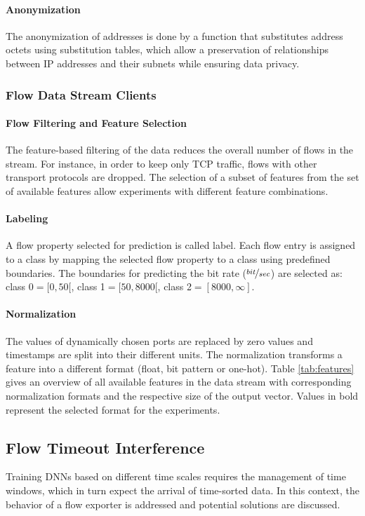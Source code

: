 \documentclass[conference]{IEEEtran}
\begin{document}
\paragraph{Anonymization}
The anonymization of addresses is done by a function that substitutes address octets using substitution tables, which allow a preservation of relationships between IP addresses and their subnets while ensuring data privacy. 

\subsubsection{Flow Data Stream Clients}\label{sec:flow_data_stream_clients}

\paragraph{Flow Filtering and Feature Selection}
The feature-based filtering of the data reduces the overall number of flows in the stream. For instance, in order to keep only TCP traffic, flows with other transport protocols are dropped. The selection of a subset of features from the set of available features allow experiments with different feature combinations.

\paragraph{Labeling}
A flow property selected for prediction is called label. Each flow entry is assigned to a class by mapping the selected flow property to a class using predefined boundaries. The boundaries for predicting the bit rate ($\nicefrac{bit}{sec}$) are selected as: class $0=[0, 50[$, class 1$=[50, 8000[$, class 2$= [8000, \infty]$.

\paragraph{Normalization}
The values of dynamically chosen ports are replaced by zero values and timestamps are split into their different units. The normalization transforms a feature into a different format (float, bit pattern or one-hot). Table \ref{tab:features} gives an overview of all available features in the data stream with corresponding normalization formats and the respective size of the output vector. Values in bold represent the selected format for the experiments.


\subsection{Flow Timeout Interference}\label{sec:flow_timeout_intererence}
Training DNNs based on different time scales requires the management of time windows, which in turn expect the arrival of time-sorted data. In this context, the behavior of a flow exporter is addressed and potential solutions are discussed.
\end{document}
